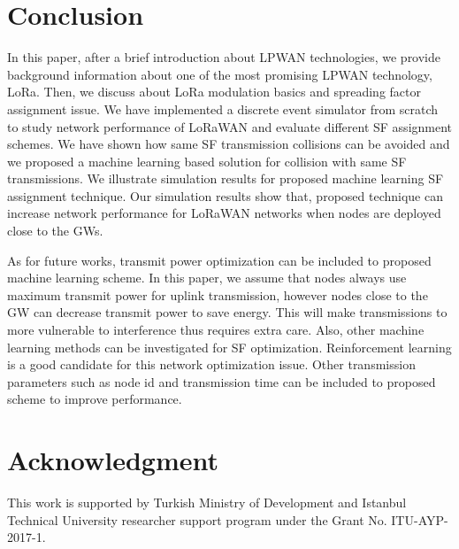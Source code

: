 \documentclass[conference]{IEEEtran}
\begin{document}
\section{Conclusion} \label{Conclusion}
\par In this paper, after a brief introduction about LPWAN technologies, we provide background information about one of the most promising LPWAN technology, LoRa. Then, we discuss about LoRa modulation basics and spreading factor assignment issue. We have implemented a discrete event simulator from scratch to study network performance of LoRaWAN and evaluate different SF assignment schemes. We have shown how same SF transmission collisions can be avoided and we proposed a machine learning based solution for collision with same SF transmissions. We illustrate simulation results for proposed machine learning SF assignment technique. Our simulation results show that, proposed technique can increase network performance for LoRaWAN networks when nodes are deployed close to the GWs.

\par As for future works, transmit power optimization can be included to proposed machine learning scheme. In this paper, we assume that nodes always use maximum transmit power for uplink transmission, however nodes close to the GW can decrease transmit power to save energy. This will make transmissions to more vulnerable to interference thus requires extra care. Also, other machine learning methods can be investigated for SF optimization. Reinforcement learning is a good candidate for this network optimization issue. Other transmission parameters such as node id and transmission time can be included to proposed scheme to improve performance.


\section*{Acknowledgment}
\par This work is supported by Turkish Ministry of Development and Istanbul Technical University researcher support program under the Grant No. ITU-AYP-2017-1.




\end{document}
